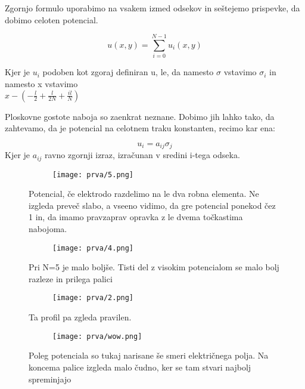 \documentclass{article}
\begin{document}
Zgornjo formulo uporabimo na vsakem izmed odsekov in seštejemo prispevke, da dobimo celoten potencial.

\begin{equation*}
u(x,y) = \sum_{i=0}^{N-1} u_i(x,y)
\end{equation*}

Kjer je $u_i$ podoben kot zgoraj definiran u, le, da namesto $\sigma$ vstavimo $\sigma_i$ in namesto x vstavimo \\
$x-\left(-\frac{l}{2} + \frac{l}{2N}+ \frac{i l}{N}\right)$

Ploskovne gostote naboja so zaenkrat neznane. Dobimo jih lahko tako, da zahtevamo, da je potencial na celotnem traku konstanten, recimo kar ena:

\begin{equation*}
u_i = a_{ij} \sigma_j
\end{equation*}
Kjer je $a_{ij}$ ravno zgornji izraz, izračunan v sredini i-tega odseka.

\begin{figure}[H]
\centering
\begin{subfigure}{\textwidth}
\texttt{[image: prva/5.png]}
\end{subfigure}
\caption*{Potencial, če elektrodo razdelimo na le dva robna elementa. Ne izgleda preveč slabo, a vseeno vidimo, da gre potencial ponekod čez 1 in, da imamo pravzaprav opravka z le dvema točkastima nabojoma.}
\end{figure}

\begin{figure}[H]
\centering
\begin{subfigure}{\textwidth}
\texttt{[image: prva/4.png]}
\end{subfigure}
\caption*{Pri N=5 je malo boljše. Tisti del z visokim potencialom se malo bolj razleze in prilega palici}
\end{figure}

\begin{figure}[H]
\centering
\begin{subfigure}{\textwidth}
\texttt{[image: prva/2.png]}
\end{subfigure}
\caption*{Ta profil pa zgleda pravilen.}
\end{figure}

\begin{figure}[H]
\centering
\begin{subfigure}{\textwidth}
\texttt{[image: prva/wow.png]}
\end{subfigure}
\caption*{Poleg potenciala so tukaj narisane še smeri električnega polja. Na koncema palice izgleda malo čudno, ker se tam stvari najbolj spreminjajo}
\end{figure}
\end{document}
